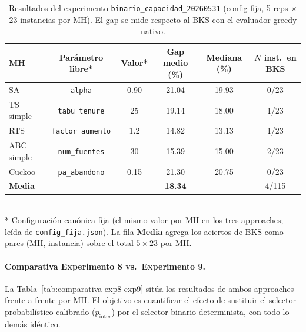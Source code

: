 \begin{table}[h]
\centering
\caption{Resultados del experimento \texttt{binario\_capacidad\_20260531}
         (config fija, 5 reps $\times$ 23 instancias por MH). El gap se mide
         respecto al BKS con el evaluador greedy nativo.}
\label{tab:binario-capacidad-resultados}
\small
\begin{tabular}{lccccc}
\toprule
MH & Parámetro libre* & Valor* &
  Gap medio (\%) & Mediana (\%) & $N$ inst.\ en BKS \\
\midrule
SA           & \texttt{alpha}           & 0.90 &
  21.04 & 19.93 & 0/23 \\
TS simple    & \texttt{tabu\_tenure}    & 25   &
  19.14 & 18.00 & 1/23 \\
RTS          & \texttt{factor\_aumento} & 1.2  &
  14.82 & 13.13 & 1/23 \\
ABC simple   & \texttt{num\_fuentes}    & 30   &
  15.39 & 15.00 & 2/23 \\
Cuckoo       & \texttt{pa\_abandono}    & 0.15 &
  21.30 & 20.75 & 0/23 \\
\midrule
\textbf{Media} & --- & --- & \textbf{18.34} & --- & 4/115 \\
\bottomrule
\end{tabular}
\\[4pt]
\footnotesize
* Configuración canónica fija (el mismo valor por MH en los tres approaches;
leída de \texttt{config\_fija.json}). La fila \textbf{Media} agrega los aciertos
de BKS como pares (MH, instancia) sobre el total $5 \times 23$ por MH.
\end{table}

\paragraph{Comparativa Experimento 8 vs.\ Experimento 9.}
La Tabla~\ref{tab:comparativa-exp8-exp9} sitúa los resultados de ambos
approaches frente a frente por MH. El objetivo es cuantificar el efecto
de sustituir el selector probabilístico calibrado ($p_{\text{inter}}$)
por el selector binario determinista, con todo lo demás idéntico.

